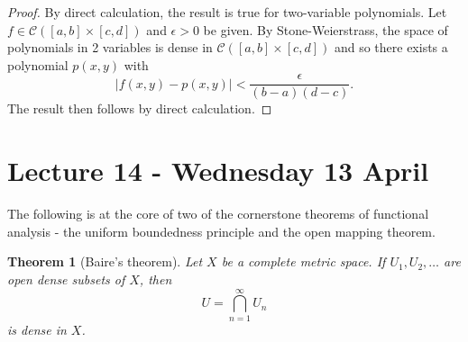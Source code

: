 \documentclass[10pt, reqno, oneside]{amsart}
\theoremstyle{plain}%
\newtheorem{thm}{Theorem}[section]
\theoremstyle{definition}
\theoremstyle{remark}
\begin{document}
\begin{proof}
	By direct calculation, the result is true for two-variable polynomials.  Let $f \in \mathcal C([a,b] \times [c,d])$ and $\epsilon > 0$ be given.  By Stone-Weierstrass, the space of polynomials in 2 variables is dense in $\mathcal C([a,b] \times [c,d])$ and so there exists a polynomial $p(x,y)$ with \[
		|f(x,y) - p(x,y)| < \frac{\epsilon}{(b-a)(d-c)}.
	\]  The result then follows by direct calculation.
\end{proof}

\section{Lecture 14 - Wednesday 13 April} %
\label{sec:lecture_14_wednesday_13_april}
The following is at the core of two of the cornerstone theorems of functional analysis - the uniform boundedness principle and the open mapping theorem.

\begin{thm}[Baire's theorem]
	Let $X$ be a complete metric space.  If $U_1, U_2, \dots$ are open dense subsets of $X$, then \[
		U = \bigcap_{n=1}^\infty U_n
	\] is dense in $X$.  
\end{thm}
\end{document}
